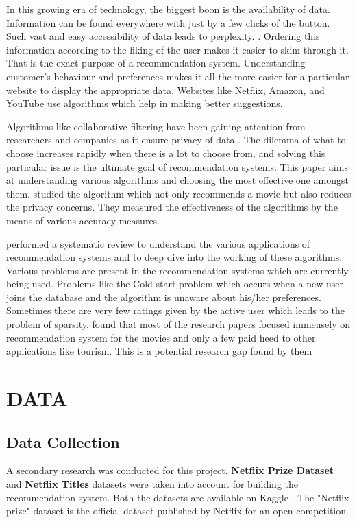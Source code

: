 \documentclass[a4paper,10pt]{article}
\begin{document}
In this growing era of technology, the biggest boon is the availability of data. Information can be found everywhere with just by a few clicks of the button. Such vast and easy accessibility of data leads to perplexity. \cite{Yeole}. Ordering this information according to the liking of the user makes it easier to skim through it. That is the exact purpose of a recommendation system. Understanding customer's behaviour and preferences makes it all the more easier for a particular website to display the appropriate data. Websites like Netflix, Amazon, and YouTube use algorithms which help in making better suggestions. 

Algorithms like collaborative filtering have been gaining attention from researchers and companies as it ensure privacy of data \cite{chenna2020}. The dilemma of what to choose increases rapidly when there is a lot to choose from, and solving this particular issue is the ultimate goal of recommendation systems. This paper aims at understanding various algorithms and choosing the most effective one amongst them. \cite{chenna2020} studied the algorithm which not only recommends a movie but also reduces the privacy concerns. They measured the effectiveness of the algorithms by the means of various accuracy measures. 


\cite{roy2022} performed a systematic review to understand the various applications of recommendation systems and to deep dive into the working of these algorithms. Various problems are present in the recommendation systems which are currently being used. Problems like the Cold start problem which occurs when a new user joins the database and the algorithm is unaware about his/her preferences. Sometimes there are very few ratings given by the active user which leads to the problem of sparsity. \cite{roy2022} found that most of the research papers focused immensely on recommendation system for the movies and only a few paid heed to other applications like tourism. This is a potential research gap found by them




\section{DATA}

\subsection{Data Collection}

A secondary research was conducted for this project.  \textbf{Netflix Prize Dataset} and \textbf{Netflix Titles}  datasets were taken into account for building the recommendation system. Both the datasets are available on Kaggle \cite{kaggle}. The "Netflix prize" dataset is the official dataset published by Netflix for an open competition. 
\end{document}
